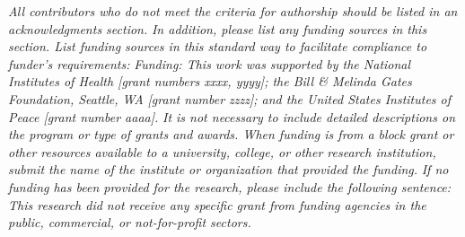 \documentclass[11pt, letterpaper]{article}
\begin{document}
\noindent
\textit{All contributors who do not meet the criteria for authorship should be listed in an acknowledgments section.} 
\vskip 0.2cm
\noindent
\textit{In addition, please list any funding sources in this section. List funding sources in this standard way to facilitate compliance to funder's requirements:}
\vskip 0.2cm
\noindent
\textit{Funding: This work was supported by the National Institutes of Health [grant numbers xxxx, yyyy]; the Bill \& Melinda Gates Foundation, Seattle, WA [grant number zzzz]; and the United States Institutes of Peace [grant number aaaa].}
\vskip 0.2cm
\noindent
\textit{It is not necessary to include detailed descriptions on the program or type of grants and awards. When funding is from a block grant or other resources available to a university, college, or other research institution, submit the name of the institute or organization that provided the funding.}
\vskip 0.2cm
\noindent
\textit{If no funding has been provided for the research, please include the following sentence:}
\vskip 0.2cm
\noindent
\textit{This research did not receive any specific grant from funding agencies in the public, commercial, or not-for-profit sectors.
}\\


%
%


\end{document}
